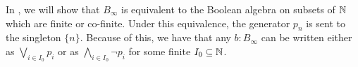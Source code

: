 \begin{remark}\label{BinftyTermsWriting}
  In , we will show that $B_\infty$ is equivalent to the Boolean algebra on 
  subsets of $\mathbb{N}$ which are finite or co-finite. 
  Under this equivalence, the generator $p_n$ is sent to the singleton $\{n\}$. 
  Because of this, we have that any $b:B_\infty$ can be written 
  either as $\bigvee_{i\in I_0} p_i$ or as $\bigwedge_{i\in I_0} \neg p_i$ for some finite $I_0\subseteq \mathbb{N}$. 
\end{remark}





